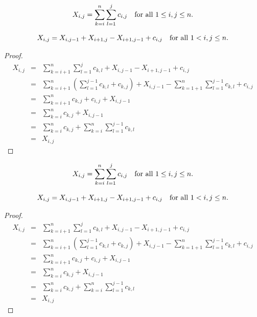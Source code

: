 \documentclass[AMA,LATO1COL]{WileyNJD-v2}
\begin{document}
\begin{definition}
\begin{equation}
X_{i,j}=\sum_{k=i}^{n}\sum_{l=1}^{j}c_{i,j}\mbox{\quad for all $1\leq i,j\leq n$}.
\end{equation}
\end{definition}

\begin{lemma}
\begin{equation}
X_{i,j}=X_{i,j-1}+X_{i+1,j}-X_{i+1,j-1}+c_{i,j} \mbox{\quad for all $1<i,j\leq n$}.
\end{equation}
\end{lemma}

\begin{proof}
\begin{eqnarray*}
X_{i,j}& = & \sum_{k=i+1}^{n}\sum_{l=1}^{j}c_{k,l}+X_{i,j-1}-X_{i+1,j-1}+c_{i,j}\\
 & = & \sum_{k=i+1}^{n}\left(\sum_{l=1}^{j-1}c_{k,l}+c_{k,j}\right)+X_{i,j-1}-\sum_{k=1+1}^{n}\sum_{l=1}^{j-1}c_{k,l}+c_{i,j}\\
 & = & \sum_{k=i+1}^{n}c_{k,j}+c_{i,j}+X_{i,j-1}\\
 & = & \sum_{k=i}^{n}c_{k,j}+X_{i,j-1}\\
 & = & \sum_{k=i}^{n}c_{k,j}+\sum_{k=i}^{n}\sum_{l=1}^{j-1}c_{k,l}\\
 & = & X_{i,j}
\end{eqnarray*}
\end{proof}

\begin{definition}
\begin{equation}
X_{i,j}=\sum_{k=i}^{n}\sum_{l=1}^{j}c_{i,j}\mbox{\quad for all $1\leq i,j\leq n$}.
\end{equation}
\end{definition}

\begin{lemma}
\begin{equation}
X_{i,j}=X_{i,j-1}+X_{i+1,j}-X_{i+1,j-1}+c_{i,j} \mbox{\quad for all $1<i,j\leq n$}.
\end{equation}
\end{lemma}

\begin{proof}
\begin{eqnarray*}
X_{i,j}& = & \sum_{k=i+1}^{n}\sum_{l=1}^{j}c_{k,l}+X_{i,j-1}-X_{i+1,j-1}+c_{i,j}\\
 & = & \sum_{k=i+1}^{n}\left(\sum_{l=1}^{j-1}c_{k,l}+c_{k,j}\right)+X_{i,j-1}-\sum_{k=1+1}^{n}\sum_{l=1}^{j-1}c_{k,l}+c_{i,j}\\
 & = & \sum_{k=i+1}^{n}c_{k,j}+c_{i,j}+X_{i,j-1}\\
 & = & \sum_{k=i}^{n}c_{k,j}+X_{i,j-1}\\
 & = & \sum_{k=i}^{n}c_{k,j}+\sum_{k=i}^{n}\sum_{l=1}^{j-1}c_{k,l}\\
 & = & X_{i,j}
\end{eqnarray*}
\end{proof}
\end{document}
